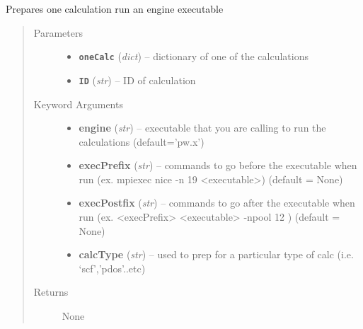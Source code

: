 \documentclass[letterpaper,10pt,english]{sphinxmanual}
\begin{document}
\begin{fulllineitems}
\label{run:run.__onePrep}
Prepares one calculation run an engine executable
\begin{quote}\begin{description}
\item[{Parameters}] \leavevmode\begin{itemize}
\item {} 
\textbf{\texttt{oneCalc}} (\emph{dict}) -- dictionary of one of the calculations

\item {} 
\textbf{\texttt{ID}} (\emph{str}) -- ID of calculation

\end{itemize}

\item[{Keyword Arguments}] \leavevmode\begin{itemize}
\item {} 
\textbf{engine} (\emph{str}) --
executable that you are calling to run the calculations (default='pw.x')

\item {} 
\textbf{execPrefix} (\emph{str}) --
commands to go before the executable when run (ex. mpiexec nice -n 19 \textless{}executable\textgreater{})
(default = None)

\item {} 
\textbf{execPostfix} (\emph{str}) --
commands to go after the executable when run (ex. \textless{}execPrefix\textgreater{} \textless{}executable\textgreater{} -npool 12 )
(default = None)

\item {} 
\textbf{calcType} (\emph{str}) --
used to prep for a particular type of calc (i.e. `scf','pdos'..etc)

\end{itemize}

\item[{Returns}] \leavevmode
None

\end{description}\end{quote}

\end{fulllineitems}

\end{document}
